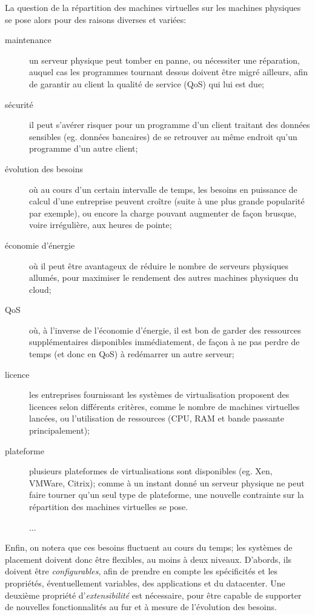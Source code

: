 \documentclass[a4paper]{article}
\begin{document}
La question de la répartition des machines virtuelles sur les machines
physiques se pose alors pour des raisons diverses et variées:
\begin{description}
	\item[maintenance] un serveur physique peut tomber en panne, ou
		nécessiter une réparation, auquel cas les programmes
		tournant dessus doivent être migré ailleurs, afin de
		garantir au client la qualité de service (QoS) qui lui est due;
	\item[sécurité] il peut s'avérer risquer pour un programme d'un
		client traitant des données sensibles (eg. données bancaires)
		de se retrouver au même endroit qu'un programme d'un
		autre client;
	\item[évolution des besoins] où au cours d'un certain intervalle de
		temps, les besoins en puissance de calcul d'une entreprise
		peuvent croître (suite à une plus grande popularité par
		exemple), ou encore la charge pouvant augmenter de façon
		brusque, voire irrégulière, aux heures de pointe;
	\item[économie d'énergie] où il peut être avantageux de réduire
		le nombre de serveurs physiques allumés, pour maximiser
		le rendement des autres machines physiques du cloud;
	\item[QoS] où, à l'inverse de l'économie d'énergie, il est bon
		de garder des ressources supplémentaires disponibles immédiatement,
		de façon à ne pas perdre de temps (et donc en QoS) à redémarrer
		un autre serveur;		
	\item[licence] les entreprises fournissant les systèmes de virtualisation
		proposent des licences selon différents critères, comme le nombre de
		machines virtuelles lancées, ou l'utilisation de ressources (CPU, RAM et bande passante
		principalement);
	\item[plateforme] plusieurs plateformes de virtualisations sont disponibles
		(eg. Xen, VMWare, Citrix); comme à un instant donné un serveur physique
		ne peut faire tourner qu'un seul type de plateforme, une nouvelle contrainte
		sur la répartition des machines virtuelles se pose.
	\item[] $\ldots$
\end{description}

Enfin, on notera que ces besoins fluctuent au cours du temps; les systèmes
de placement doivent donc être flexibles, au moins à deux niveaux.
D'abords, ils doivent être \textit{configurables}, afin de prendre en compte
les spécificités et les propriétés, éventuellement variables, des applications
et du datacenter. Une deuxième propriété d'\textit{extensibilité} est nécessaire,
pour être capable de supporter de nouvelles fonctionnalités au fur et à mesure
de l'évolution des besoins.
\end{document}
